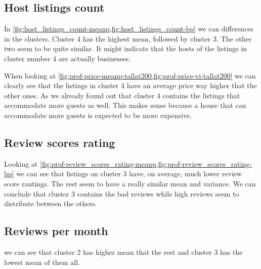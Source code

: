 \clearpage
\subsection{Host listings count}%

In \cref{fig:host_listings_count-meanp,fig:host_listings_count-bp} we can differences in the clusters.
Cluster 4 has the highest mean, followed by cluster 3. The other two seem to be quite 
similar. It might indicate that the hosts of the listings in cluster number 4 are actually businesses.

When looking at \cref{fig:prof-price-meanp-tallat200,fig:prof-price-vi-tallat200} we can clearly see that the listings in cluster 4 have an average price way higher that the other ones. As we already found out that cluster 4 contains the listings that accommodate more guests as well. This makes sense because a house that can accommodate more guests is expected to be more expensive. 


\subsection{Review scores rating}%
\label{sub:prof-review_scores_rating}


Looking at \cref{fig:prof-review_scores_rating-meanp,fig:prof-review_scores_rating-bp} we can see that listings on cluster 3 have, on average, much lower review score rantings. The rest seem to have a really similar mean and variance. We can conclude that cluster 3 contains the bad reviews while high reviews seem to distribute between the others.

\clearpage
\subsection{Reviews per month}%


 we can see that cluster 2 has higher mean that the rest and
cluster 3 has the lowest mean of them all.



